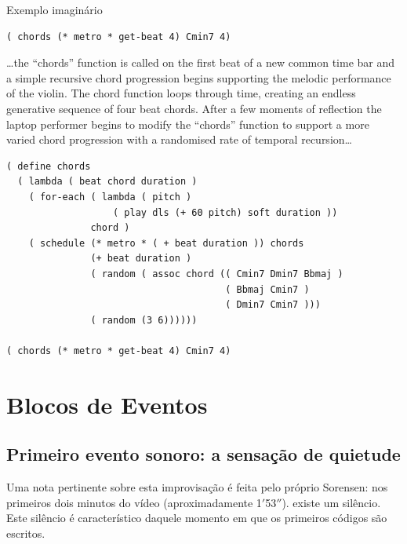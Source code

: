 \begin{example}{Exemplo imaginário}
\begin{verbatim}
( chords (* metro * get-beat 4) Cmin7 4)
\end{verbatim}

\begin{citacao}
{\ldots the “chords” function is called on the first beat of a new common time bar and a simple recursive chord progression begins supporting the melodic performance of the violin. The chord function loops through time, creating an endless generative sequence of four beat chords. After a few moments of reflection the laptop performer begins to modify the “chords” function to support a more varied chord progression with a randomised rate of temporal recursion\ldots}
\end{citacao}

\begin{verbatim}
( define chords
  ( lambda ( beat chord duration )
    ( for-each ( lambda ( pitch )
                   ( play dls (+ 60 pitch) soft duration ))
               chord )
    ( schedule (* metro * ( + beat duration )) chords
               (+ beat duration )
               ( random ( assoc chord (( Cmin7 Dmin7 Bbmaj )
                                       ( Bbmaj Cmin7 )
                                       ( Dmin7 Cmin7 )))
               ( random (3 6))))))

( chords (* metro * get-beat 4) Cmin7 4)
\end{verbatim}
\end{example}

\section{Blocos de Eventos}\label{sec:eventos}

\subsection{Primeiro evento sonoro: a sensação de quietude}\label{sec:silencio}

Uma nota pertinente sobre esta improvisação é feita pelo próprio Sorensen: nos primeiros dois minutos do vídeo (aproximadamente 1$'$53$''$). existe um silêncio. Este silêncio é característico daquele momento em que os primeiros códigos são escritos.

